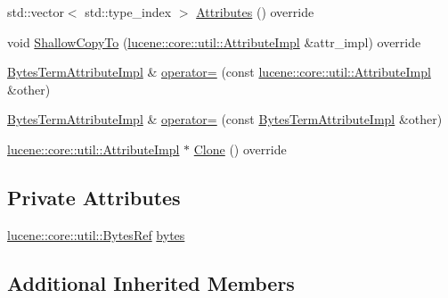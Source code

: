\begin{DoxyCompactItemize}
\item 
std\+::vector$<$ std\+::type\+\_\+index $>$ \mbox{\hyperlink{classlucene_1_1core_1_1analysis_1_1tokenattributes_1_1BytesTermAttributeImpl_aff915b815335534889b45fa2ce773692}{Attributes}} () override
\item 
void \mbox{\hyperlink{classlucene_1_1core_1_1analysis_1_1tokenattributes_1_1BytesTermAttributeImpl_aafc25a873ed04661a26d6a7b5f6d2b0d}{Shallow\+Copy\+To}} (\mbox{\hyperlink{classlucene_1_1core_1_1util_1_1AttributeImpl}{lucene\+::core\+::util\+::\+Attribute\+Impl}} \&attr\+\_\+impl) override
\item 
\mbox{\hyperlink{classlucene_1_1core_1_1analysis_1_1tokenattributes_1_1BytesTermAttributeImpl}{Bytes\+Term\+Attribute\+Impl}} \& \mbox{\hyperlink{classlucene_1_1core_1_1analysis_1_1tokenattributes_1_1BytesTermAttributeImpl_acfaef15f10ddfec3e2494c6d2176ac73}{operator=}} (const \mbox{\hyperlink{classlucene_1_1core_1_1util_1_1AttributeImpl}{lucene\+::core\+::util\+::\+Attribute\+Impl}} \&other)
\item 
\mbox{\hyperlink{classlucene_1_1core_1_1analysis_1_1tokenattributes_1_1BytesTermAttributeImpl}{Bytes\+Term\+Attribute\+Impl}} \& \mbox{\hyperlink{classlucene_1_1core_1_1analysis_1_1tokenattributes_1_1BytesTermAttributeImpl_a3d91c14505c1b59ea0372697b87c79f6}{operator=}} (const \mbox{\hyperlink{classlucene_1_1core_1_1analysis_1_1tokenattributes_1_1BytesTermAttributeImpl}{Bytes\+Term\+Attribute\+Impl}} \&other)
\item 
\mbox{\hyperlink{classlucene_1_1core_1_1util_1_1AttributeImpl}{lucene\+::core\+::util\+::\+Attribute\+Impl}} $\ast$ \mbox{\hyperlink{classlucene_1_1core_1_1analysis_1_1tokenattributes_1_1BytesTermAttributeImpl_a149760a0122009e6b699862553d43b41}{Clone}} () override
\end{DoxyCompactItemize}
\subsection*{Private Attributes}
\begin{DoxyCompactItemize}
\item 
\mbox{\hyperlink{classlucene_1_1core_1_1util_1_1BytesRef}{lucene\+::core\+::util\+::\+Bytes\+Ref}} \mbox{\hyperlink{classlucene_1_1core_1_1analysis_1_1tokenattributes_1_1BytesTermAttributeImpl_aedd53d552069d367ff2ede8111ce1944}{bytes}}
\end{DoxyCompactItemize}
\subsection*{Additional Inherited Members}


